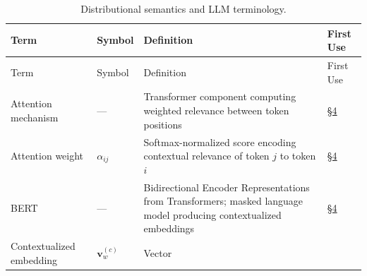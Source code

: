 \documentclass[
]{article}
\begin{document}
\begin{longtable}[]{@{}
  >{\raggedright\arraybackslash}p{}
  >{\centering\arraybackslash}p{}
  >{\raggedright\arraybackslash}p{}
  >{\centering\arraybackslash}p{}@{}}
\caption{Distributional semantics and LLM
terminology.}\label{tbl:not-distributional}\tabularnewline
\toprule\noalign{}
\begin{minipage}[b]{\linewidth}\raggedright
Term
\end{minipage} & \begin{minipage}[b]{\linewidth}\centering
Symbol
\end{minipage} & \begin{minipage}[b]{\linewidth}\raggedright
Definition
\end{minipage} & \begin{minipage}[b]{\linewidth}\centering
First Use
\end{minipage} \\
\midrule\noalign{}
\endfirsthead
\toprule\noalign{}
\begin{minipage}[b]{\linewidth}\raggedright
Term
\end{minipage} & \begin{minipage}[b]{\linewidth}\centering
Symbol
\end{minipage} & \begin{minipage}[b]{\linewidth}\raggedright
Definition
\end{minipage} & \begin{minipage}[b]{\linewidth}\centering
First Use
\end{minipage} \\
\midrule\noalign{}
\endhead
\bottomrule\noalign{}
\endlastfoot
Attention mechanism & --- & Transformer component computing weighted
relevance between token positions &
\href{04_categorical_semantics.md\#sec:categorical-semantics}{§4} \\
Attention weight & \(\alpha_{ij}\) & Softmax-normalized score encoding
contextual relevance of token \(j\) to token \(i\) &
\href{04_categorical_semantics.md\#sec:categorical-semantics}{§4} \\
BERT & --- & Bidirectional Encoder Representations from Transformers;
masked language model producing contextualized embeddings &
\href{04_categorical_semantics.md\#sec:categorical-semantics}{§4} \\
Contextualized embedding & \(\mathbf{v}_w^{(c)}\) & Vector

\end{longtable}
\end{document}
